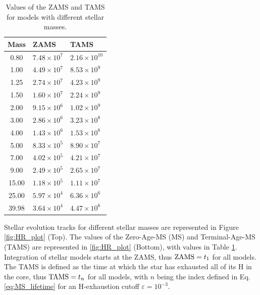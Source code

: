 \begin{table}[!ht]
    \centering
    \caption{\small Values of the ZAMS and TAMS for models with different stellar masses.}
    \begin{tabular}{|c|l|l|}
        \hline
        Mass  & ZAMS                 & TAMS                  \\ \hline
        0.80  & $7.48 \times 10^{7}$ & $2.16 \times 10^{10}$ \\ \hline
        1.00  & $4.49 \times 10^{7}$ & $8.53 \times 10^{9}$  \\  \hline
        1.25  & $2.74 \times 10^{7}$ & $4.23 \times 10^{9}$  \\ \hline
        1.50  & $1.60 \times 10^{7}$ & $2.24 \times 10^{9}$  \\ \hline
        2.00  & $9.15 \times 10^{6}$ & $1.02 \times 10^{9}$  \\ \hline
        3.00  & $2.86 \times 10^{6}$ & $3.23 \times 10^{8}$  \\ \hline
        4.00  & $1.43 \times 10^{6}$ & $1.53 \times 10^{8}$  \\ \hline
        5.00  & $8.33 \times 10^{5}$ & $8.90 \times 10^{7}$  \\ \hline
        7.00  & $4.02 \times 10^{5}$ & $4.21 \times 10^{7}$  \\ \hline
        9.00  & $2.49 \times 10^{5}$ & $2.65 \times 10^{7}$  \\ \hline
        15.00 & $1.18 \times 10^{5}$ & $1.11 \times 10^{7}$  \\ \hline
        25.00 & $5.97 \times 10^{4}$ & $6.36 \times 10^{6}$  \\ \hline
        39.98 & $3.64 \times 10^{4}$ & $4.47 \times 10^{6}$  \\ \hline
    \end{tabular}
    \label{tab:ages}
\end{table}

\newpage

Stellar evolution tracks for different stellar masses are represented in Figure \ref{fig:HR_plot} (Top). The values of the Zero-Age-MS (MS) and Terminal-Age-MS (TAMS) are represented in \ref{fig:HR_plot} (Bottom), with values in Table \ref{tab:ages}. Integration of stellar models starts at the ZAMS, thus ${\rm ZAMS} = t_1$ for all models. The TAMS is defined as the time at which the star has exhausted all of its H in the core, thus ${\rm TAMS} = t_n$ for all models, with $n$ being the index defined in Eq. \eqref{eq:MS_lifetime} for an H-exhaustion cutoff $\varepsilon=10^{-3}$.

